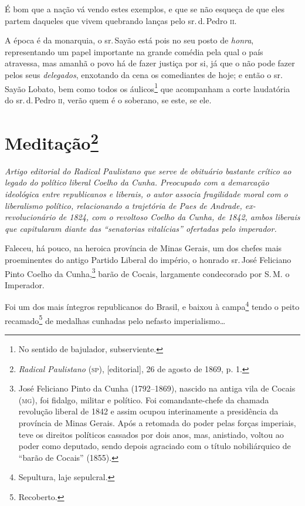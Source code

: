 É bom que a nação vá vendo estes exemplos, e que se não esqueça de que
eles partem daqueles que vivem quebrando lanças pelo sr.\,d.\,Pedro \textsc{ii}.

A época é da monarquia, o sr.\,Sayão está pois no seu posto de
\emph{honra}, representando um papel importante na grande comédia pela
qual o país atravessa, mas amanhã o povo há de fazer justiça por si, já
que o não pode fazer pelos seus \emph{delegados}, enxotando da cena os
comediantes de hoje; e então o sr.\,Sayão Lobato, bem como todos os
áulicos\footnote{No sentido de bajulador, subserviente.} que
acompanham a corte laudatória do sr.\,d.\,Pedro \textsc{ii}, verão quem é o
soberano, se este, se ele.

\chapter{Meditação\footnote{\emph{Radical Paulistano} (\textsc{sp}),
  {[}editorial{]}, 26 de agosto de 1869, p. 1.}}

\begin{didascalia}\itshape
Artigo editorial do \textnormal{Radical Paulistano} que serve de obituário
bastante crítico ao legado do político liberal Coelho da Cunha.
Preocupado com a demarcação ideológica entre republicanos e liberais, o
autor associa fragilidade moral com o liberalismo político, relacionando
a trajetória de Paes de Andrade, ex-revolucionário de 1824, com o
revoltoso Coelho da Cunha, de 1842, ambos liberais que capitularam
diante das ``senatorias vitalícias'' ofertadas pelo imperador.
\end{didascalia}



Faleceu, há pouco, na heroica província de Minas Gerais, um dos chefes
mais proeminentes do antigo Partido Liberal do império, o honrado sr.\,José Feliciano Pinto Coelho da Cunha,\footnote{José Feliciano Pinto da
  Cunha (1792--1869), nascido na antiga vila de Cocais (\textsc{mg}), foi fidalgo,
  militar e político. Foi comandante-chefe da chamada revolução liberal
  de 1842 e assim ocupou interinamente a presidência da província de
  Minas Gerais. Após a retomada do poder pelas forças imperiais, teve os
  direitos políticos cassados por dois anos, mas, anistiado, voltou ao
  poder como deputado, sendo depois agraciado com o título nobiliárquico
  de ``barão de Cocais'' (1855).} barão de Cocais, largamente condecorado
por S.\,M. o Imperador.

Foi um dos mais íntegros republicanos do Brasil, e baixou à
campa\footnote{Sepultura, laje sepulcral.} tendo o peito
recamado\footnote{Recoberto.} de medalhas cunhadas pelo nefasto
imperialismo\ldots{}

